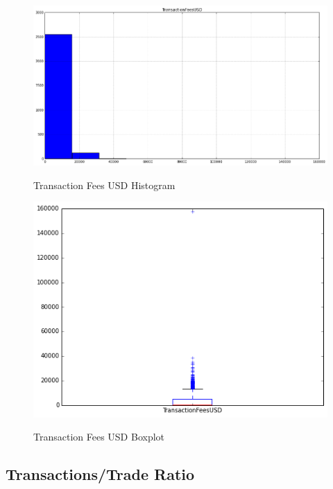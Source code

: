 \begin{figure}[bth]
  \myfloatalign
  {\includegraphics[width=1\linewidth]
    {gfx/transaction-fees-usd-histogram}}
  \caption{Transaction Fees USD
    Histogram}
  \label{fig:transaction-fees-usd-histogram}
\end{figure}

\begin{figure}[bth]
  \myfloatalign
  {\includegraphics[width=1\linewidth]
    {gfx/transaction-fees-usd-boxplot}}
  \caption{Transaction Fees USD
    Boxplot}
  \label{fig:transaction-fees-usd-boxplot}
\end{figure}

\clearpage

\subsection{Transactions/Trade Ratio}
\label{sec:tx-trade-ratio}

